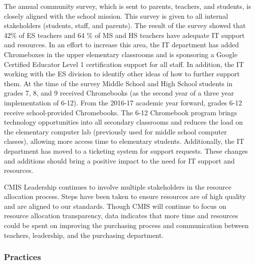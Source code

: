 \begin{findings}
The annual community survey, which is sent to parents, teachers, and students, is closely aligned with the school mission. This survey is given to all internal stakeholders (students, staff, and parents). The result of the survey showed that 42\% of ES teachers and 64 \% of MS and HS teachers have adequate IT support and resources.  In an effort to increase this area, the IT department has added Chromeboxes in the upper elementary classrooms and is sponsoring a Google Certified Educator Level 1 certification support for all staff. In addition, the IT working with the ES division to identify other ideas of how to further support them. At the time of the survey Middle School and High School students in grades 7, 8, and 9 received Chromebooks (as the second year of a three year implementation of 6-12). From the 2016-17 academic year forward, grades 6-12 receive school-provided Chromebooks. The 6-12 Chromebook program brings technology opportunities into all secondary classrooms and reduces the load on the elementary computer lab (previously used for middle school computer classes), allowing more access time to elementary students. Additionally, the IT department has moved to a ticketing system for support requests. These changes and additions should bring a positive impact to the need for IT support and resources.


CMIS Leadership continues to involve multiple stakeholders in the resource allocation process. Steps have been taken to ensure resources are of high quality and are aligned to our standards. Though CMIS will continue to focus on resource allocation transparency, data indicates that more time and resources could be spent on improving the purchasing process and communication between teachers, leadership, and the purchasing department.  
\end{findings}

\subsubsection{Practices}



